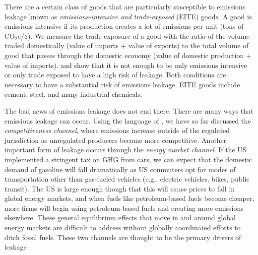 There are a certain class of goods that are particularly susceptible to emissions leakage known as \emph{emissions-intensive and trade-exposed} (EITE) goods. A good is emissions intensive if its production creates a lot of emissions per unit (tons of CO$_2$e/\$). We measure the trade exposure of a good with the ratio of the volume traded domestically (value of imports $+$ value of exports) to the total volume of good that passes through the domestic economy (value of domestic production $+$ value of imports). \cite{fowlie2022mitigating} and \cite{fowlie2016measuring} show that it is not enough to be only emissions intensive or only trade exposed to have a high risk of leakage. Both conditions are necessary to have a substantial risk of emissions leakage. EITE goods include cement, steel, and many industrial chemicals.

The bad news of emissions leakage does not end there. There are many ways that emissions leakage can occur. Using the language of \cite{cosbey2020developing}, we have so far discussed the \emph{competitiveness channel}, where emissions increase outside of the regulated jurisdiction as unregulated producers become more competitive. Another important form of leakage occurs through the \emph{energy market channel}. If the US implemented a stringent tax on GHG from cars, we can expect that the domestic demand of gasoline will fall dramatically as US commuters opt for modes of transportation other than gas-fueled vehicles (e.g., electric vehicles, bikes, public transit). The US is large enough though that this will cause prices to fall in global energy markets, and when fuels like petroleum-based fuels become cheaper, more firms will begin using petroleum-based fuels and creating more emissions elsewhere. These general equilibrium effects that move in and around global energy markets are difficult to address without globally coordinated efforts to ditch fossil fuels. These two channels are thought to be the primary drivers of leakage \citep{branger2014climate}

